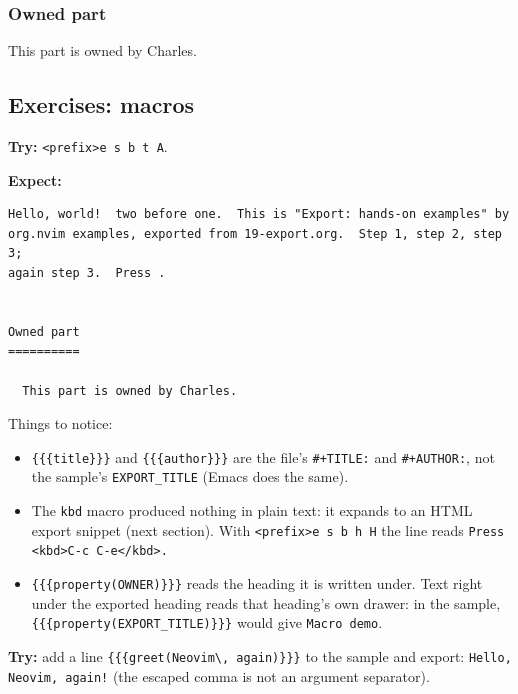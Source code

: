\subsubsection{Owned part}
\label{sec:org617150d}
This part is owned by Charles.
\subsection{Exercises: macros}
\label{sec:orgb6d0386}
\textbf{Try:} \texttt{<prefix>e s b t A}.

\textbf{Expect:}

\begin{verbatim}
Hello, world!  two before one.  This is "Export: hands-on examples" by
org.nvim examples, exported from 19-export.org.  Step 1, step 2, step 3;
again step 3.  Press .


Owned part
==========

  This part is owned by Charles.
\end{verbatim}

Things to notice:
\begin{itemize}
\item \texttt{\{\{\{title\}\}\}} and \texttt{\{\{\{author\}\}\}} are the file's \texttt{\#+TITLE:} and
\texttt{\#+AUTHOR:}, not the sample's \texttt{EXPORT\_TITLE} (Emacs does the same).
\item The \texttt{kbd} macro produced nothing in plain text: it expands to an HTML
export snippet (next section). With \texttt{<prefix>e s b h H} the line reads
\texttt{Press <kbd>C-c C-e</kbd>.}
\item \texttt{\{\{\{property(OWNER)\}\}\}} reads the heading it is written under. Text
right under the exported heading reads that heading's own drawer: in the
sample, \texttt{\{\{\{property(EXPORT\_TITLE)\}\}\}} would give \texttt{Macro demo}.
\end{itemize}

\textbf{Try:} add a line \texttt{\{\{\{greet(Neovim\textbackslash{}, again)\}\}\}} to the sample and export:
\texttt{Hello, Neovim, again!} (the escaped comma is not an argument separator).

